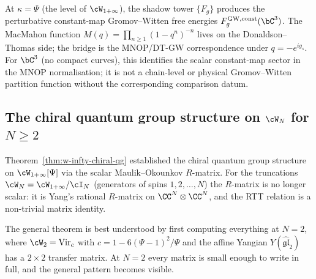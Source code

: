 \begin{remark}
\label{rem:shadow-gw-c3}
At $\kappa = \Psi$ \textup{(}the level of $\cW_{1+\infty}$\textup{)},
the shadow tower $\{F_g\}$ produces the perturbative
constant-map Gromov--Witten free energies
$F_g^{\mathrm{GW,const}}(\bC^3)$. The MacMahon function
$M(q) = \prod_{n \geq 1}(1 - q^n)^{-n}$ lives on the
Donaldson--Thomas side; the bridge is the MNOP/DT-GW
correspondence under $q = -e^{i g_s}$. For $\bC^3$
\textup{(}no compact curves\textup{)}, this identifies the scalar
constant-map sector in the MNOP normalisation; it is not a chain-level
or physical Gromov--Witten partition function without the corresponding
comparison datum.
\end{remark}


\subsection{The chiral quantum group structure on
$\cW_N$ for $N \geq 2$}
\label{subsec:glN-chiral-qg}

Theorem~\ref{thm:w-infty-chiral-qg} established the chiral
quantum group structure on $\cW_{1+\infty}[\Psi]$ via the
scalar Maulik--Okounkov $R$-matrix. For the truncations
$\cW_N = \cW_{1+\infty}/\cI_N$ (generators of spins
$1, 2, \ldots, N$) the $R$-matrix is no longer scalar: it
is Yang's rational $R$-matrix on $\CC^N \otimes \CC^N$,
and the RTT relation is a non-trivial matrix identity.

The general theorem is best understood by first computing
everything at $N = 2$, where $\cW_2 = \mathrm{Vir}_c$ with
$c = 1 - 6(\Psi - 1)^2/\Psi$ and the affine Yangian
$Y(\widehat{\mathfrak{gl}}_2)$ has a $2 \times 2$ transfer
matrix. At $N = 2$ every matrix is small enough to write
in full, and the general pattern becomes visible.

